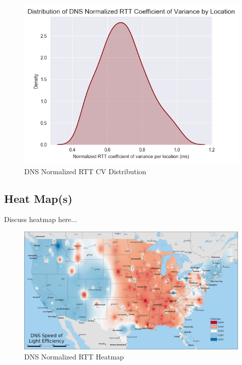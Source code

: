 \begin{figure}[H]
    \centering
    \includegraphics[width=\textwidth]{images/dns/dist_raw_data/dns_norm_rtt_cv_distribution.png}
    \caption{DNS Normalized RTT CV Distribution}
    \label{fig:dns_analytics_norm_cv_dist}
\end{figure}

\subsection{Heat Map(s)}

Discuss heatmap here...


\begin{figure}[H]
    \centering
    \includegraphics[width=\textwidth]{images/dns/heatmaps/dns_speed_of_light_idw.png}
    \caption{DNS Normalized RTT Heatmap}
    \label{fig:dns_normalized_rtt_heatmap}
\end{figure}

